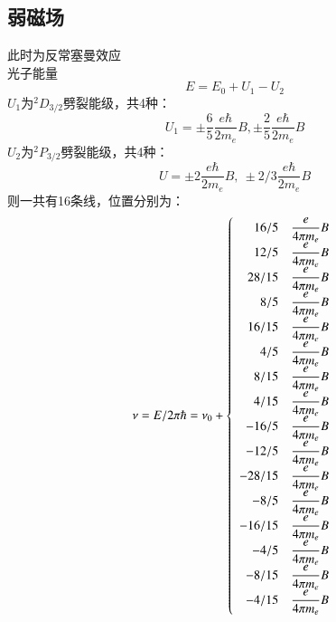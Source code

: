 \documentclass[UTF8,9pt]{ctexart}
\begin{document}
                \subsection{弱磁场}
                此时为反常塞曼效应\\
                光子能量$$E=E_0+U_1-U_2$$
                $U_1$为${}^2D_{3/2}$劈裂能级，共4种：
                $$U_1=\pm\dfrac{6}{5}\dfrac{e\hbar}{2m_e} B,\pm\dfrac{2}{5}\dfrac{e\hbar}{2m_e}B$$
                $U_2$为${}^2P_{3/2}$劈裂能级，共4种：
                $$U=\pm2\dfrac{e\hbar}{2m_e} B,\ \pm2/3\dfrac{e\hbar}{2m_e}B$$
                则一共有16条线，位置分别为：
                $$\nu=E/2\pi\hbar=\nu_0+\left\{\begin{array}{rl} 
                    16/5 & \dfrac{e}{4\pi m_e} B\\
                    12/5 & \dfrac{e}{4\pi m_e} B\\
                    28/15 & \dfrac{e}{4\pi m_e} B\\
                    8/5 & \dfrac{e}{4\pi m_e} B\\
                    16/15 & \dfrac{e}{4\pi m_e} B\\
                    4/5 & \dfrac{e}{4\pi m_e} B\\
                    8/15 & \dfrac{e}{4\pi m_e} B\\
                    4/15 & \dfrac{e}{4\pi m_e} B\\
                    -16/5 & \dfrac{e}{4\pi m_e} B\\
                    -12/5 & \dfrac{e}{4\pi m_e} B\\
                    -28/15 & \dfrac{e}{4\pi m_e} B\\
                    -8/5 & \dfrac{e}{4\pi m_e} B\\
                    -16/15 & \dfrac{e}{4\pi m_e} B\\
                    -4/5 & \dfrac{e}{4\pi m_e} B\\
                    -8/15 & \dfrac{e}{4\pi m_e} B\\
                    -4/15 & \dfrac{e}{4\pi m_e} B\\
                 \end{array}\right.$$


        
\end{document}
